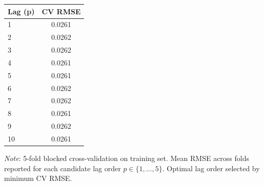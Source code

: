 \begin{tabular}{lc}
  \toprule
  \textbf{Lag (p)} & \textbf{CV RMSE} \\ 
  \midrule
  1 & 0.0261 \\ 
  2 & 0.0262 \\ 
  3 & 0.0262 \\ 
  4 & 0.0261 \\ 
  5 & 0.0261 \\ 
  6 & 0.0262 \\ 
  7 & 0.0262 \\ 
  8 & 0.0261 \\ 
  9 & 0.0262 \\ 
  10 & 0.0261 \\ 
  \bottomrule
\end{tabular}
\par\vspace{4pt}
\begin{minipage}{\linewidth}
  \footnotesize \textit{Note}: 5-fold blocked cross-validation on training set. Mean RMSE across folds reported for each candidate lag order $p \in \{1, \dots, 5\}$. Optimal lag order selected by minimum CV RMSE.
\end{minipage}